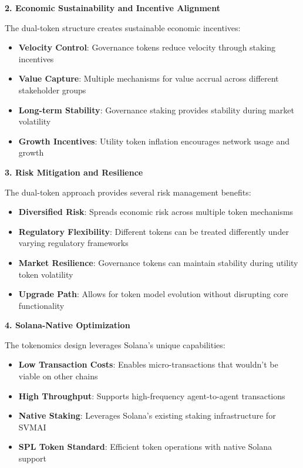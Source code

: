 \documentclass[12pt,a4paper]{article}
\begin{document}
\textbf{2. Economic Sustainability and Incentive Alignment}

The dual-token structure creates sustainable economic incentives:

\begin{itemize}
\item \textbf{Velocity Control}: Governance tokens reduce velocity through staking incentives
\item \textbf{Value Capture}: Multiple mechanisms for value accrual across different stakeholder groups
\item \textbf{Long-term Stability}: Governance staking provides stability during market volatility
\item \textbf{Growth Incentives}: Utility token inflation encourages network usage and growth
\end{itemize}

\textbf{3. Risk Mitigation and Resilience}

The dual-token approach provides several risk management benefits:

\begin{itemize}
\item \textbf{Diversified Risk}: Spreads economic risk across multiple token mechanisms
\item \textbf{Regulatory Flexibility}: Different tokens can be treated differently under varying regulatory frameworks
\item \textbf{Market Resilience}: Governance tokens can maintain stability during utility token volatility
\item \textbf{Upgrade Path}: Allows for token model evolution without disrupting core functionality
\end{itemize}

\textbf{4. Solana-Native Optimization}

The tokenomics design leverages Solana's unique capabilities:

\begin{itemize}
\item \textbf{Low Transaction Costs}: Enables micro-transactions that wouldn't be viable on other chains
\item \textbf{High Throughput}: Supports high-frequency agent-to-agent transactions
\item \textbf{Native Staking}: Leverages Solana's existing staking infrastructure for SVMAI
\item \textbf{SPL Token Standard}: Efficient token operations with native Solana support
\end{itemize}
\end{document}
